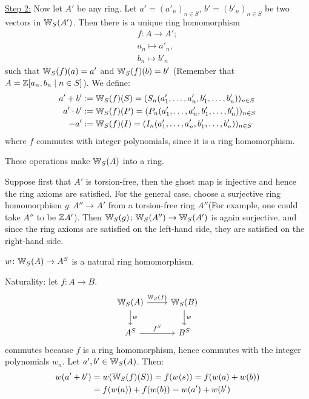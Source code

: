 \begin{bigproof}
    \underline{Step 2:} Now let $A'$ be any ring.
    Let $a' = (a'_n)_{n \in S}$, $b' = (b'_n)_{n \in S}$ be two vectors in $\mathbb{W}_S(A')$.
    Then there is a unique ring homomorphism
    \begin{align*}
        f \colon A \to A'; \\
        a_n \mapsto a'_n, \\
        b_n \mapsto b'_n
    \end{align*}
    such that $\mathbb{W}_S(f)(a) = a'$ and $\mathbb{W}_S(f)(b) = b'$
    (Remember that $A = \mathbb{Z}[a_n,b_n \mid n \in S]$).
    We define:
    \begin{align*}
        a'+ b' &:= \mathbb{W}_S(f)(S) 
        = (S_n(a'_1,\dots,a'_n,b'_1,\dots,b'_n))_{n \in S} \\
        a' \cdot b' &:= \mathbb{W}_S(f)(P) = (P_n(a'_1,\dots,a'_n,b'_1,\dots,b'_n))_{n \in S} \\
        -a' &:= \mathbb{W}_S(f)(I) = (I_n(a'_1,\dots,a'_n,b'_1,\dots,b'_n))_{n \in S}
    \end{align*}
    where $f$ commutes with integer polynomials, since it is a ring homomorphism.
\begin{claim*}
    These operations make $\mathbb{W}_S(A)$ into a ring.
\end{claim*}
\begin{smallproof}
    Suppose first that $A'$ is torsion-free, then the ghost map is injective
    and hence the ring axioms are satisfied.
    For the general case, choose a surjective ring homomorphism $g \colon A'' \to A'$
    from a torsion-free ring $A''$(For example, one could take $A''$ to be $\mathbb{Z} A'$).
    Then $\mathbb{W}_S (g)\colon \mathbb{W}_S(A'') \to \mathbb{W}_S(A')$ is again surjective, and since the
    ring axioms are satisfied on the left-hand side, they are satisfied on the right-hand side.
\end{smallproof}
\begin{claim*}
    $w \colon \mathbb{W}_S(A) \to A^S$ is a natural ring homomorphism.
\end{claim*}
Naturality: let $f \colon A \to B$.
\[
    \begin{tikzcd}
        \W_S(A) \arrow[r,"\W_S(f)"] \arrow[d,"w"] 
          & \W_S(B) \arrow[d,"w"] \\
        A^S \arrow[r,"f^S"]
          & B^S
    \end{tikzcd}
\]
commutes because $f$ is a ring homomorphism, hence commutes with the integer polynomials $w_n$.
Let $a',b' \in \mathbb{W}_S(A)$. Then: 
\begin{align*}
    w(a'+b') &= w(\mathbb{W}_S(f)(S)) = f(w(s)) = f(w(a)+w(b)) \\
    &= f(w(a)) + f(w(b)) = w(a') +w(b')
\end{align*}
\end{bigproof}
